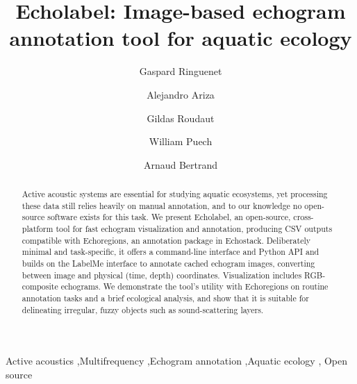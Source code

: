 \documentclass[
  number,
  preprint,
  3p]{elsarticle}
\begin{document}
\begin{frontmatter}
\title{Echolabel: Image-based echogram annotation tool for aquatic
ecology}
\author[1]{Gaspard Ringuenet%
%
}
\author[2]{Alejandro Ariza%
%
}
\author[3]{Gildas Roudaut%
%
}
\author[4]{William Puech%
%
}
\author[1]{Arnaud Bertrand%
%
}







        
\begin{abstract}
Active acoustic systems are essential for studying aquatic ecosystems,
yet processing these data still relies heavily on manual annotation, and
to our knowledge no open-source software exists for this task. We
present Echolabel, an open-source, cross-platform tool for fast echogram
visualization and annotation, producing CSV outputs compatible with
Echoregions, an annotation package in Echostack. Deliberately minimal
and task-specific, it offers a command-line interface and Python API and
builds on the LabelMe interface to annotate cached echogram images,
converting between image and physical (time, depth) coordinates.
Visualization includes RGB-composite echograms. We demonstrate the
tool's utility with Echoregions on routine annotation tasks and a brief
ecological analysis, and show that it is suitable for delineating
irregular, fuzzy objects such as sound-scattering layers.
\end{abstract}





\begin{keyword}
    Active acoustics \sep Multifrequency \sep Echogram
annotation \sep Aquatic ecology \sep 
    Open source
\end{keyword}
\end{frontmatter}
    
\end{document}
